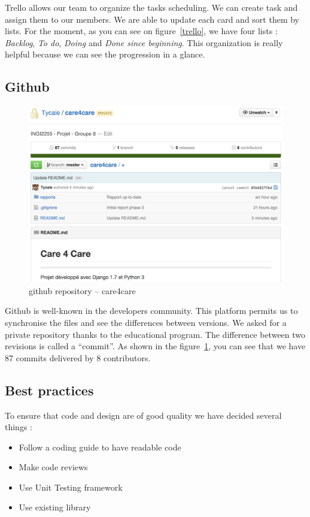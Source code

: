\documentclass[11pt, a4paper]{article}   	%
\newcommand{\tit}[1]{\textit{#1}}
\begin{document}
Trello allows our team to organize the tasks scheduling.
We can create task and assign them to our members.
We are able to update each card and sort them by lists.
For the moment, as you can see on figure~\ref{trello}, we have four lists : \tit{Backlog}, \tit{To do}, \tit{Doing} and \tit{Done since beginning}.
This organization is really helpful because we can see the progression in a glance.

\subsection{Github} 

\begin{figure}[!ht]
   \includegraphics[width=\textwidth]{github.png}
   \caption{\label{github} github repository – care4care}
\end{figure}

Github is well-known in the developers community.
This platform permits us to synchronise the files and see the differences between versions.
We asked for a private repository thanks to the educational program.
The difference between two revisions is called a \enquote{commit}.
As shown in the figure~\ref{github}, you can see that we have 87 commits delivered by 8 contributors.

\subsection{Best practices}

To ensure that code and design are of good quality we have decided several things :

\begin{itemize}
\item Follow a coding guide to have readable code
\item Make code reviews
\item Use Unit Testing framework
\item Use existing library
\end{itemize} 
\end{document}
